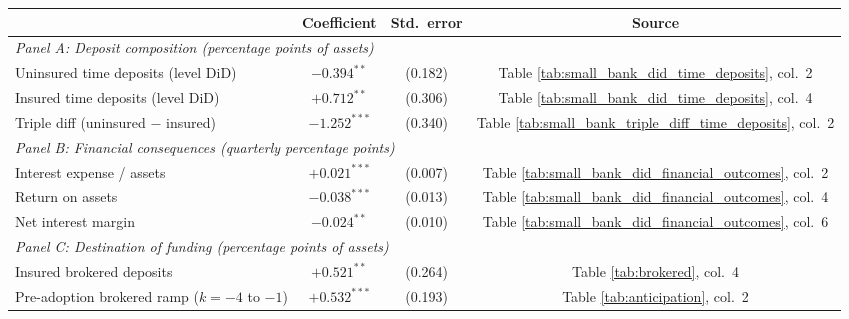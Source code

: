 \begin{tabular}{lccc}
\toprule
 & Coefficient & Std.\ error & Source \\
\midrule
\multicolumn{4}{l}{\textit{Panel A: Deposit composition (percentage points of assets)}} \\
\quad Uninsured time deposits (level DiD) & $-0.394^{**}$ & (0.182) & Table \ref{tab:small_bank_did_time_deposits}, col.\ 2 \\
\quad Insured time deposits (level DiD)    & $+0.712^{**}$ & (0.306) & Table \ref{tab:small_bank_did_time_deposits}, col.\ 4 \\
\quad Triple diff (uninsured $-$ insured)  & $-1.252^{***}$ & (0.340) & Table \ref{tab:small_bank_triple_diff_time_deposits}, col.\ 2 \\
\midrule
\multicolumn{4}{l}{\textit{Panel B: Financial consequences (quarterly percentage points)}} \\
\quad Interest expense / assets            & $+0.021^{***}$ & (0.007) & Table \ref{tab:small_bank_did_financial_outcomes}, col.\ 2 \\
\quad Return on assets                     & $-0.038^{***}$ & (0.013) & Table \ref{tab:small_bank_did_financial_outcomes}, col.\ 4 \\
\quad Net interest margin                  & $-0.024^{**}$  & (0.010) & Table \ref{tab:small_bank_did_financial_outcomes}, col.\ 6 \\
\midrule
\multicolumn{4}{l}{\textit{Panel C: Destination of funding (percentage points of assets)}} \\
\quad Insured brokered deposits            & $+0.521^{**}$ & (0.264) & Table \ref{tab:brokered}, col.\ 4 \\
\quad Pre-adoption brokered ramp ($k=-4$ to $-1$) & $+0.532^{***}$ & (0.193) & Table \ref{tab:anticipation}, col.\ 2 \\
\bottomrule
\end{tabular}
